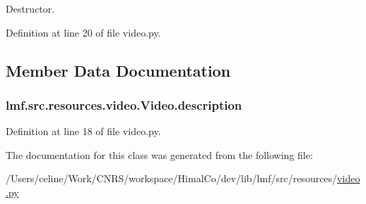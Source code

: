 Destructor. 



Definition at line 20 of file video.\+py.



\subsection{Member Data Documentation}
\hypertarget{classlmf_1_1src_1_1resources_1_1video_1_1_video_a21f39ce29f1958b3c82169eabbffc34d}{
\subsubsection[{description}]{\setlength{\rightskip}{0pt plus 5cm}lmf.\+src.\+resources.\+video.\+Video.\+description}}\label{classlmf_1_1src_1_1resources_1_1video_1_1_video_a21f39ce29f1958b3c82169eabbffc34d}


Definition at line 18 of file video.\+py.



The documentation for this class was generated from the following file\+:\begin{DoxyCompactItemize}
\item 
/\+Users/celine/\+Work/\+C\+N\+R\+S/workspace/\+Himal\+Co/dev/lib/lmf/src/resources/\hyperlink{video_8py}{video.\+py}\end{DoxyCompactItemize}
